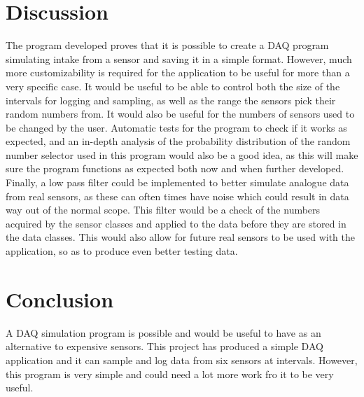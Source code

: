 \documentclass[11pt, A4paper, norsk]{article}
\begin{document}
	\section{Discussion}
The program developed proves that it is possible to create a DAQ program simulating intake from a sensor and saving it in a simple format. However, much more customizability is required for the application to be useful for more than a very specific case. It would be useful to be able to control both the size of the intervals for logging and sampling, as well as the range the sensors pick their random numbers from. It would also be useful for the numbers of sensors used to be changed by the user. Automatic tests for the program to check if it works as expected, and an in-depth analysis of the probability distribution of the random number selector used in this program would also be a good idea, as this will make sure the program functions as expected both now and when further developed. \\
Finally, a low pass filter could be implemented to better simulate analogue data from real sensors, as these can often times have noise which could result in data way out of the normal scope. This filter would be a check of the numbers acquired by the sensor classes and applied to the data before they are stored in the data classes. This would also allow for future real sensors to be used with the application, so as to produce even better testing data.

	\section{Conclusion}
A DAQ simulation program is possible and would be useful to have as an alternative to expensive sensors. This project has produced a simple DAQ application and it can sample and log data from six sensors at intervals. However, this program is very simple and could need a lot more work fro it to be very useful.
	
\end{document}
